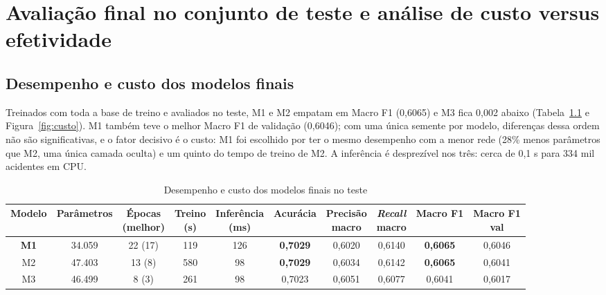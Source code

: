 \chapter{Avaliação final no conjunto de teste e análise de custo versus efetividade}
\label{cap:teste}

\section{Desempenho e custo dos modelos finais}
\label{sec:finais}

Treinados com toda a base de treino e avaliados no teste, M1 e M2 empatam em Macro F1 (0,6065) e M3 fica 0,002 abaixo (Tabela~\ref{tab:finais} e Figura~\ref{fig:custo}). M1 também teve o melhor Macro F1 de validação (0,6046); com uma única semente por modelo, diferenças dessa ordem não são significativas, e o fator decisivo é o custo: M1 foi escolhido por ter o mesmo desempenho com a menor rede (28\% menos parâmetros que M2, uma única camada oculta) e um quinto do tempo de treino de M2. A inferência é desprezível nos três: cerca de 0,1 s para 334 mil acidentes em CPU.

\begin{table}[!htbp]
\caption{Desempenho e custo dos modelos finais no teste}
\label{tab:finais}
\begin{center}
\scriptsize
\setlength{\tabcolsep}{4pt}
\begin{tabular}{cccccccccc}
\hline
\textbf{Modelo} & \textbf{Parâmetros} & \makecell{\textbf{Épocas}\\\textbf{(melhor)}} & \makecell{\textbf{Treino}\\\textbf{(s)}} & \makecell{\textbf{Inferência}\\\textbf{(ms)}} & \textbf{Acurácia} & \makecell{\textbf{Precisão}\\\textbf{macro}} & \makecell{\textbf{\textit{Recall}}\\\textbf{macro}} & \textbf{Macro F1} & \makecell{\textbf{Macro F1}\\\textbf{val}} \\ \hline
\textbf{M1} & 34.059 & 22 (17) & 119 & 126 & \textbf{0,7029} & 0,6020 & 0,6140 & \textbf{0,6065} & 0,6046 \\
M2 & 47.403 & 13 (8) & 580 & 98 & \textbf{0,7029} & 0,6034 & 0,6142 & \textbf{0,6065} & 0,6041 \\
M3 & 46.499 & 8 (3) & 261 & 98 & 0,7023 & 0,6051 & 0,6077 & 0,6041 & 0,6017 \\ \hline
\end{tabular}
\end{center}
\end{table}

